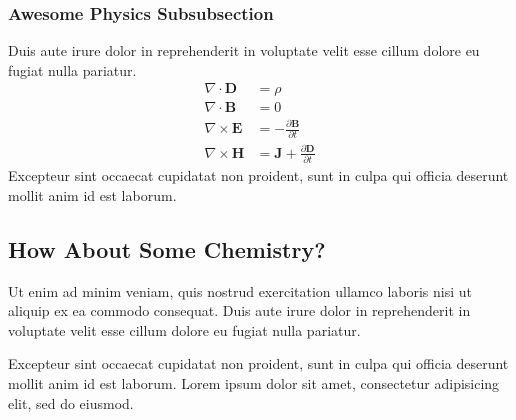 \documentclass{modernCS}
\begin{document}
\subsubsection{Awesome Physics Subsubsection}
Duis aute irure dolor in reprehenderit in voluptate velit esse
cillum dolore eu fugiat nulla pariatur.
\begin{align*}
	\nabla \cdot \mathbf{D} &= \rho \\
	\nabla \cdot \mathbf{B} &= 0 \\
	\nabla \times \mathbf{E} &= -\frac{\partial \mathbf{B}} {\partial t} \\
	\nabla \times \mathbf{H} &= \mathbf{J} + \frac{\partial \mathbf{D}} {\partial t}
\end{align*}
Excepteur sint occaecat cupidatat non
proident, sunt in culpa qui officia deserunt mollit anim id est laborum.
\subsection{How About Some Chemistry?}
Ut enim ad minim veniam,
quis nostrud exercitation ullamco laboris nisi ut aliquip ex ea commodo
consequat. Duis aute irure dolor in reprehenderit in voluptate velit esse
cillum dolore eu fugiat nulla pariatur.
\begin{center}
\end{center}
Excepteur sint occaecat cupidatat non
proident, sunt in culpa qui officia deserunt mollit anim id est laborum.
Lorem ipsum dolor sit amet, consectetur adipisicing elit, sed do eiusmod.
\end{document}
